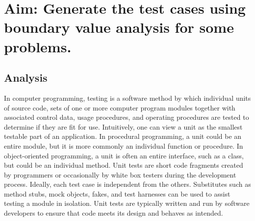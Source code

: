 \section*{\fontsize{16}{14}\selectfont Aim: Generate the test cases using boundary value analysis for some problems.}
\subsection*{Analysis}
In computer programming, testing is a software method by which individual units of source code, sets of one or more computer program modules together with associated control data, usage procedures, and operating procedures are tested to determine if they are fit for use. Intuitively, one can view a unit as the smallest testable part of an application. In procedural programming, a unit could be an entire module, but it is more commonly an individual function or procedure. In object-oriented programming, a unit is often an entire interface, such as a class, but could be an individual method. Unit tests are short code fragments created by programmers or occasionally by white box testers during the development process. Ideally, each test case is independent from the others. Substitutes such as method stubs, mock objects, fakes, and test harnesses can be used to assist testing a module in isolation. Unit tests are typically written and run by software developers to ensure that code meets its design and behaves as intended. 

